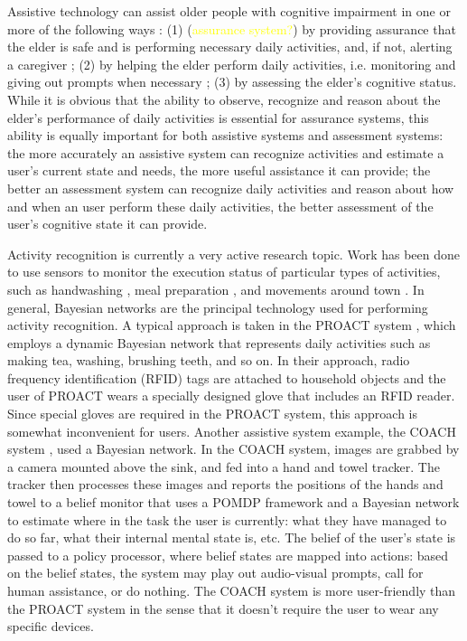 Assistive technology can assist older people with cognitive impairment in one or more of the following ways \cite{pollack2005intelligent}: (1) (\textcolor{yellow}{assurance system?}) by providing assurance that the elder is safe and is performing necessary daily activities, and, if not, alerting a caregiver \cite{hoey2012lacasa}; (2) by helping the elder perform daily activities, i.e. monitoring and giving out prompts when necessary \cite{boger2005decision, peters2014automatic, hoey2010automated}; (3) by assessing the elder's cognitive status. While it is obvious that the ability to observe, recognize and reason about the elder's performance of daily activities is essential for assurance systems, this ability is equally important for both assistive systems and assessment systems: the more accurately an assistive system can recognize activities and estimate a user's current state and needs, the more useful assistance it can provide; the better an assessment system can recognize daily activities and reason about how and when an user perform these daily activities, the better assessment of the user's cognitive state it can provide.

Activity recognition is currently a very active research topic. Work has been done to use sensors to monitor the execution status of particular types of activities, such as handwashing \cite{hoey2010automated}, meal preparation \cite{philipose2004inferring}, and movements around town \cite{hoey2012lacasa}. In general, Bayesian networks are the principal technology used for performing activity recognition. A typical approach is taken in the PROACT system \cite{philipose2004inferring}, which employs a dynamic Bayesian network that represents daily activities such as making tea, washing, brushing teeth, and so on. In their approach, radio frequency identification (RFID) tags are attached to household objects and the user of PROACT wears a specially designed glove that includes an RFID reader. Since special gloves are required in the PROACT system, this approach is somewhat inconvenient for users. Another assistive system example, the COACH system \cite{boger2005decision, hoey2010automated}, used a Bayesian network. In the COACH system, images are grabbed by a camera mounted above the sink, and fed into a hand and towel tracker. The tracker then processes these images and reports the positions of the hands and towel to a belief monitor that uses a POMDP framework and a Bayesian network to estimate where in the task the user is currently: what they have managed to do so far, what their internal mental state is, etc. The belief of the user's state is passed to a policy processor, where belief states are mapped into actions: based on the belief states, the system may play out audio-visual prompts, call for human assistance, or do nothing. The COACH system is more user-friendly than the PROACT system in the sense that it doesn't require the user to wear any specific devices.

